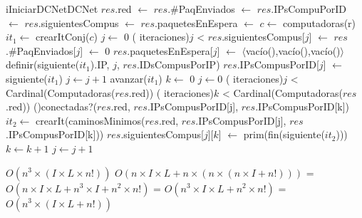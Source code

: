 \begin{Algoritmos}


  \begin{algoritmo}{iIniciarDCNet}{}{DCNet}
    $res$.red $\gets$    
    $res$.\#PaqEnviados $\gets$     
    $res$.IPsCompuPorID $\gets$     
    $res$.siguientesCompus $\gets$     
    $res$.paquetesEnEspera $\gets$     
     $c \gets$ computadoras(r)   
     $it_{1} \gets$ crearItConj($c$)    
     $j \gets$ 0   
    \While( iteraciones){$j$ < }{
      $res$.siguientesCompus[$j$] $\gets$     
      $res$.\#PaqEnviados[$j$] $\gets$ 0   
      $res$.paquetesEnEspera[$j$] $\gets$ $\langle$vac\'{i}o(),vac\'{i}o(),vac\'{i}o()$\rangle$   
      definir(siguiente($it_{1}$).IP, $j$, $res$.IDsCompusPorIP)   
      $res$.IPsCompusPorID[$j$] $\gets$ siguiente($it_{1}$)    
      $j \gets j + 1$   
      avanzar($it_{1}$)   
    }
     $k \gets$ 0   
    $j \gets 0$   
    \While( iteraciones){$j$ < Cardinal(Computadoras($res$.red))}{
      \While( iteraciones){$k$ < Cardinal(Computadoras($res$.red))}{
        \If(){conectadas?($res$.red, $res$.IPsCompusPorID[j], $res$.IPsCompusPorID[k])}{
           $it_{2} \gets$ crearIt(caminosMinimos($res$.red, $res$.IPsCompusPorID[j], $res$.IPsCompusPorID[k])) 
          $res$.siguientesCompus[$j$][$k$] $\gets$ prim(fin(siguiente($it_{2}$)))
        }
        $k \gets k + 1$  
      }
      $j \gets j + 1$  
    }
  \end{algoritmo}
 \datosAlgoritmo{} %
  {} %
  {} %
  {$O(n^3 \times (I \times L \times n!))$} %
  {$O(n \times I \times L + n \times (n \times (n \times I + n!)))$ = $O(n \times I \times L + n^3 \times I + n^2 \times n!)$ = $O(n^3 \times I \times L + n^2 \times n!)$ = $O(n^3 \times (I \times L + n!))$} %


\end{Algoritmos}

